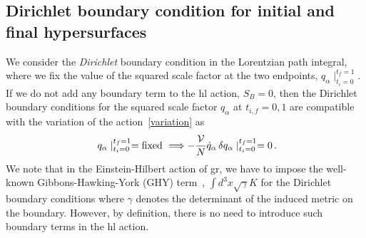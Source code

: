 \documentclass[superscriptaddress,aps,preprintnumbers,nofootinbib]{revtex4-2}
\begin{document}
\subsection{Dirichlet boundary condition for initial and final hypersurfaces}



We consider the \emph{Dirichlet} boundary condition in the Lorentzian path integral, where we fix the value of the squared scale factor at the two endpoints, $q_{\alpha}\mid^{t_{f}=1}_{t_{i}=0}$. If we do not add any boundary term to the \ac{hl} action, $S_B=0$, then the Dirichlet boundary conditions for the squared scale factor $q_{\alpha}$ at $t_{i,f}=0,1$ are compatible with the variation of the action~\eqref{variation} as 
\begin{align}
 \ q_{\alpha}\mid^{t_{f}=1}_{t_{i}=0} = \textrm{fixed}\ 
 \Longrightarrow 
 -\frac{{\cal V}}{N}\dot{q}_{\alpha}\, \delta q_{\alpha}\mid^{t_{f}=1}_{t_{i}=0} = 0\,. 
 \label{Dirichlet}
\end{align}
We note that in the Einstein-Hilbert action of \ac{gr}, we have to impose the well-known Gibbons-Hawking-York (GHY) term~\cite{York:1972sj, Gibbons:1976ue}, $\int d^3x \sqrt{\gamma}K$ for the Dirichlet boundary conditions where $\gamma$ denotes the determinant of the induced metric on the boundary. However, by definition, there is no need to introduce such boundary terms in the \ac{hl} action.
\end{document}
